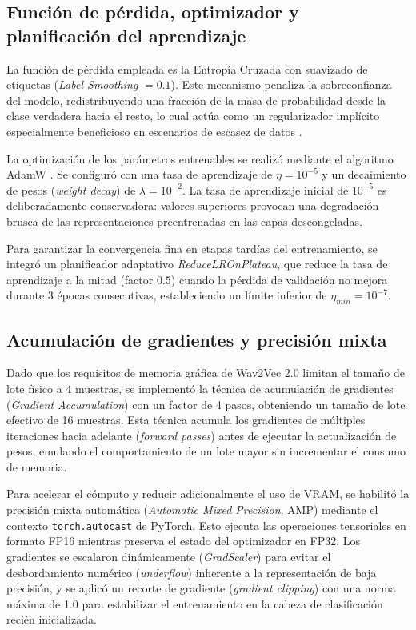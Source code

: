 \subsection{Función de pérdida, optimizador y planificación del aprendizaje}

La función de pérdida empleada es la Entropía Cruzada con suavizado de etiquetas (\textit{Label Smoothing} $= 0.1$). Este mecanismo penaliza la sobreconfianza del modelo, redistribuyendo una fracción de la masa de probabilidad desde la clase verdadera hacia el resto, lo cual actúa como un regularizador implícito especialmente beneficioso en escenarios de escasez de datos \cite{szegedy2016}.

La optimización de los parámetros entrenables se realizó mediante el algoritmo AdamW \cite{loshchilov2017}. Se configuró con una tasa de aprendizaje de $\eta = 10^{-5}$ y un decaimiento de pesos (\textit{weight decay}) de $\lambda = 10^{-2}$. La tasa de aprendizaje inicial de $10^{-5}$ es deliberadamente conservadora: valores superiores provocan una degradación brusca de las representaciones preentrenadas en las capas descongeladas.

Para garantizar la convergencia fina en etapas tardías del entrenamiento, se integró un planificador adaptativo \textit{ReduceLROnPlateau}, que reduce la tasa de aprendizaje a la mitad (factor $0.5$) cuando la pérdida de validación no mejora durante 3 épocas consecutivas, estableciendo un límite inferior de $\eta_{min} = 10^{-7}$.

\subsection{Acumulación de gradientes y precisión mixta}

Dado que los requisitos de memoria gráfica de Wav2Vec 2.0 limitan el tamaño de lote físico a 4 muestras, se implementó la técnica de acumulación de gradientes (\textit{Gradient Accumulation}) \cite{ott2019} con un factor de 4 pasos, obteniendo un tamaño de lote efectivo de 16 muestras. Esta técnica acumula los gradientes de múltiples iteraciones hacia adelante (\textit{forward passes}) antes de ejecutar la actualización de pesos, emulando el comportamiento de un lote mayor sin incrementar el consumo de memoria.

Para acelerar el cómputo y reducir adicionalmente el uso de VRAM, se habilitó la precisión mixta automática (\textit{Automatic Mixed Precision}, AMP) mediante el contexto \texttt{torch.autocast} de PyTorch. Esto ejecuta las operaciones tensoriales en formato FP16 mientras preserva el estado del optimizador en FP32. Los gradientes se escalaron dinámicamente (\textit{GradScaler}) para evitar el desbordamiento numérico (\textit{underflow}) inherente a la representación de baja precisión, y se aplicó un recorte de gradiente (\textit{gradient clipping}) con una norma máxima de 1.0 para estabilizar el entrenamiento en la cabeza de clasificación recién inicializada.

